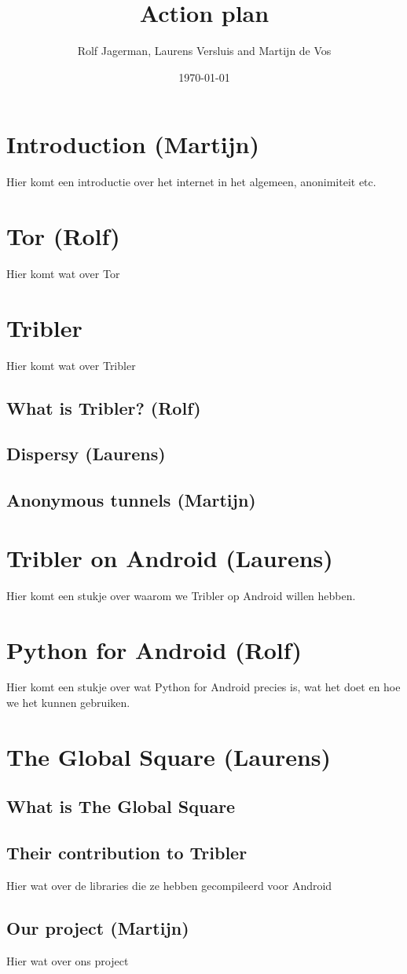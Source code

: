 \documentclass[11pt]{article}
\title{Action plan}
\author{Rolf Jagerman, Laurens Versluis and Martijn de Vos}
\date{\today}
\begin{document}
\maketitle

\pagebreak

\section{Introduction (Martijn)}
Hier komt een introductie over het internet in het algemeen, anonimiteit etc.

\section{Tor (Rolf)}
Hier komt wat over Tor

\section{Tribler}
Hier komt wat over Tribler

\subsection{What is Tribler? (Rolf)}

\subsection{Dispersy (Laurens)}

\subsection{Anonymous tunnels (Martijn)}

\section{Tribler on Android (Laurens)}
Hier komt een stukje over waarom we Tribler op Android willen hebben.

\section{Python for Android (Rolf)}
Hier komt een stukje over wat Python for Android precies is, wat het doet en hoe we het kunnen gebruiken.

\section{The Global Square (Laurens)}

\subsection{What is The Global Square}

\subsection{Their contribution to Tribler}
Hier wat over de libraries die ze hebben gecompileerd voor Android

\subsection{Our project (Martijn)}
Hier wat over ons project
\end{document}
